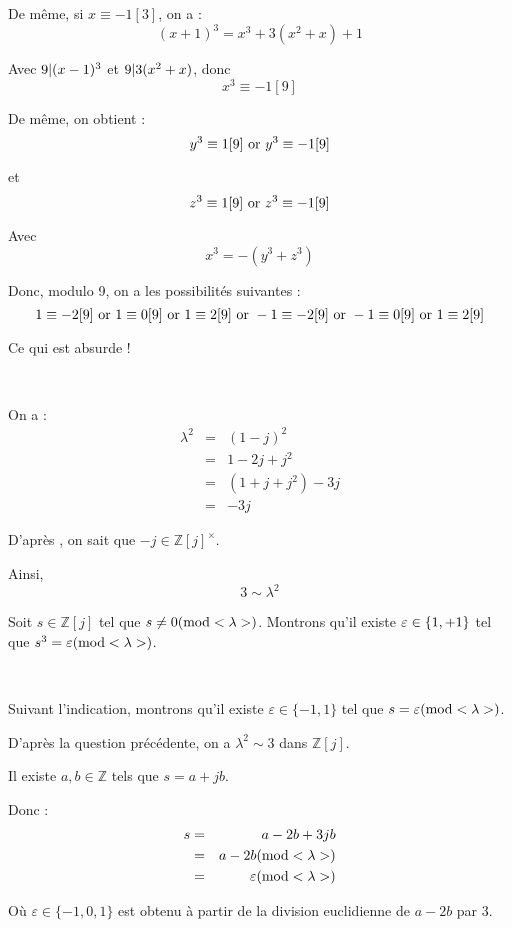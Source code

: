 De m{\^e}me, si $x \equiv - 1 [3]$, on a :
\[ (x + 1)^3 = x^3 + 3 (x^2 + x ) + 1 \]


Avec $9 | (x - 1)^3 \nobracket$ et $9 | 3 (x^2 + x ) \nobracket$, donc
\[ x^3 \equiv - 1 [9] \]


De m{\^e}me, on obtient :
\[ y^3 \equiv 1 [9] \infixor y^3 \equiv - 1 [9] \]


et
\[ z^3 \equiv 1 [9] \infixor z^3 \equiv - 1 [9] \]


Avec
\[ x^3 = - (y^3 + z^3) \]


Donc, modulo 9, on a les possibilit{\'e}s suivantes :
\[ 1 \equiv - 2 [9] \infixor 1 \equiv 0 [9] \infixor 1 \equiv 2 [9] \infixor -
   1 \equiv - 2 [9] \infixor - 1 \equiv 0 [9] \infixor 1 \equiv 2 [9] \]


Ce qui est absurde !

\

 On a :
\begin{eqnarray*}
  \lambda^2 & = & (1 - j)^2\\
  & = & 1 - 2 j + j^2\\
  & = & (1 + j + j^2) - 3 j\\
  & = & - 3 j
\end{eqnarray*}


D'apr{\`e}s , on sait que $- j \in
\mathbb{Z} [j]^{\times}$.

Ainsi,
\[ 3 \sim \lambda^2 \]


 Soit $s \in \mathbb{Z}[j]$ tel que $s \neq 0 (\tmop{mod} <
\lambda >)$. Montrons qu'il existe $\varepsilon \in \{\nonconverted{minus} 1,
+ 1\}$ tel que $s^3 = \varepsilon (\tmop{mod} < \lambda >)$.

\

Suivant l'indication, montrons qu'il existe $\varepsilon \in \{ - 1, 1 \}$
tel que $s = \varepsilon (\tmop{mod} < \lambda  >)$.

D'apr{\`e}s la question pr{\'e}c{\'e}dente, on a $\lambda^2 \sim 3$ dans
$\mathbb{Z} [j]$.

Il existe $a, b \in \mathbb{Z}$ tels que $s = a + j b $.

Donc :
\begin{eqnarray*}
  s & = & a - 2 b + 3 j b\\
  & = & a - 2 b (\tmop{mod} < \lambda >)\\
  & = & \varepsilon (\tmop{mod} < \lambda >)
\end{eqnarray*}


O{\`u} $\varepsilon \in \{ - 1, 0, 1 \}$ est obtenu {\`a} partir de la
division euclidienne de $a - 2 b$ par $3$.

